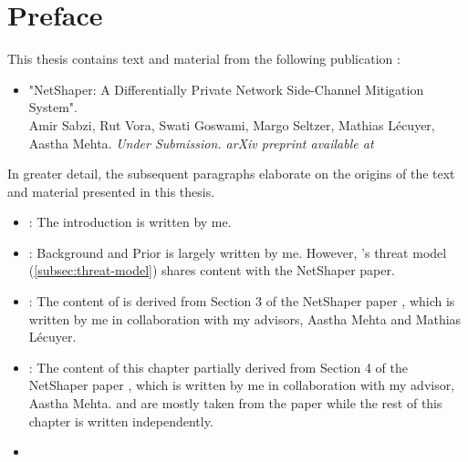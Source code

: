 
\chapter{Preface}

This thesis contains text and material from the following publication \addref:
\begin{itemize}
  \item "NetShaper: A Differentially Private Network Side-Channel Mitigation System".
  \\
  Amir Sabzi, Rut Vora, Swati Goswami, Margo Seltzer, Mathias Lécuyer, Aastha Mehta. \textit{Under Submission. arXiv preprint available at \addref}
\end{itemize}
In greater detail, the subsequent paragraphs elaborate on the origins of the text and material presented in this thesis.
\begin{itemize}
  \item \textbf{}: The introduction is written by me. 
  \item \textbf{}: Background and Prior is largely written by me. However, {\sys}'s threat model (\ref{subsec:threat-model}) shares content with the NetShaper paper.
  \item \textbf{}: The content of  is derived from Section 3 of the NetShaper paper {\addref}, which is written by me in collaboration with my advisors, Aastha Mehta and Mathias L\'{e}cuyer. 
  \item \textbf{}: The content of this chapter partially derived from Section 4 of the NetShaper paper {\addref}, which is written by me in collaboration with my advisor, Aastha Mehta.  and  are mostly taken from the paper while the rest of this chapter is written independently.
  \item {}
\end{itemize}